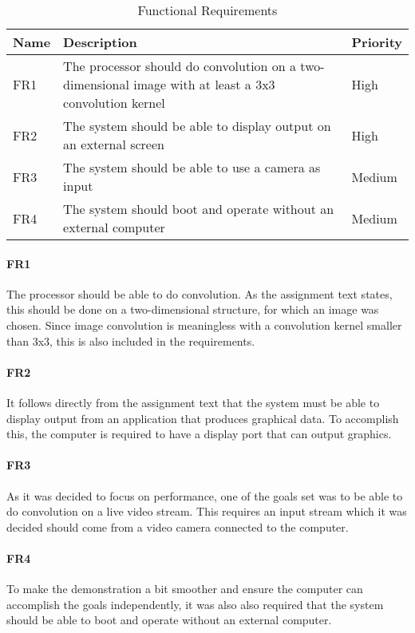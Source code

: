 \begin{table}[h]
    \centering
    \begin{tabular}{lp{12cm}l}
        Name & Description & Priority \\
        \hline
        FR1 &
            The processor should do convolution on a two-dimensional image with at least a 3x3 convolution kernel &
            High \\
        FR2 &
            The system should be able to display output on an external screen &
            High \\
        FR3 &
            The system should be able to use a camera as input &
            Medium \\
        FR4 &
            The system should boot and operate without an external computer &
            Medium
    \end{tabular}
    \caption{Functional Requirements}
    \label{tab:FunctionalRequirements}
\end{table}

\paragraph{FR1}
The processor should be able to do convolution.
As the assignment text states, this should be done on a two-dimensional structure, for which an image was chosen.
Since image convolution is meaningless with a convolution kernel smaller than 3x3,
this is also included in the requirements.

\paragraph{FR2}
It follows directly from the assignment text that the system must be able to display output from an application that produces graphical data.
To accomplish this, the computer is required to have a display port that can output graphics.

\paragraph{FR3}
As it was decided to focus on performance, one of the goals set was to be able to do convolution on a live video stream.
This requires an input stream which it was decided should come from a video camera connected to the computer.

\paragraph{FR4}
To make the demonstration a bit smoother and ensure the computer can accomplish the goals independently, it was also also required that the system should be able to boot and operate without an external computer.

